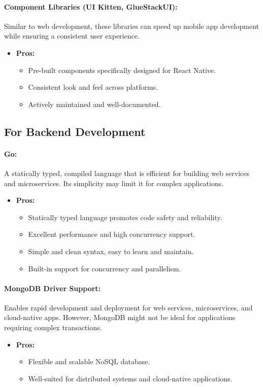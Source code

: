\documentclass[11pt,a4paper]{article}
\begin{document}
\paragraph{Component Libraries (UI Kitten, GlueStackUI):} Similar to web development, these libraries can speed up mobile app development while ensuring a consistent user experience.
\begin{itemize}
    \item \textbf{Pros:}
    \begin{itemize}
        \item Pre-built components specifically designed for React Native.
        \item Consistent look and feel across platforms.
        \item Actively maintained and well-documented.
    \end{itemize}
\end{itemize}

\subsection*{For Backend Development}

\paragraph{Go:} A statically typed, compiled language that is efficient for building web services and microservices. Its simplicity may limit it for complex applications.
\begin{itemize}
    \item \textbf{Pros:}
    \begin{itemize}
        \item Statically typed language promotes code safety and reliability.
        \item Excellent performance and high concurrency support.
        \item Simple and clean syntax, easy to learn and maintain.
        \item Built-in support for concurrency and parallelism.
    \end{itemize}
\end{itemize}

\paragraph{MongoDB Driver Support:} Enables rapid development and deployment for web services, microservices, and cloud-native apps. However, MongoDB might not be ideal for applications requiring complex transactions.
\begin{itemize}
    \item \textbf{Pros:}
    \begin{itemize}
        \item Flexible and scalable NoSQL database.
        \item Well-suited for distributed systems and cloud-native applications.
    \end{itemize}
\end{itemize}
\end{document}
